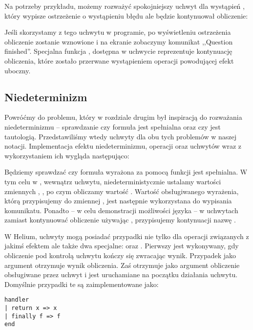 Na potrzeby przykładu, możemy rozważyć spokojniejszy uchwyt dla wystąpień , który wypisze ostrzeżenie o wystąpieniu błędu ale będzie kontynuował obliczenie:



Jeśli skorzystamy z tego uchwytu w programie, po wyświetleniu ostrzeżenia obliczenie  zostanie wznowione i na ekranie zobaczymy komunikat ,,Question finished''. Specjalna funkcja , dostępna w uchwycie reprezentuje kontynuację obliczenia, które zostało przerwane wystąpieniem operacji powodującej efekt uboczny.

\subsection{Niedeterminizm}

Powróćmy do problemu, który w rozdziale drugim był inspiracją do rozważania niedeterminizmu -- sprawdzanie czy formuła jest spełnialna oraz czy jest tautologią. Przedstawiliśmy wtedy uchwyty dla obu tych problemów w naszej notacji. Implementacja efektu niedeterminizmu, operacji  oraz uchwytów wraz z wykorzystaniem ich wygląda następująco:



Będziemy sprawdzać czy formuła wyrażona za pomocą funkcji  jest spełnialna. W tym celu w , wewnątrz uchwytu, niedeterministycznie ustalamy wartości zmiennych , ,  po czym obliczamy wartość . Wartość obsługiwanego wyrażenia, którą przypisujemy do zmiennej , jest następnie wykorzystana do wypisania komunikatu. Ponadto -- w celu demonstracji możliwości języka -- w uchwytach zamiast kontynuować obliczenie używając , przypisujemy kontynuacji nazwę .

W Helium, uchwyty mogą posiadać przypadki nie tylko dla operacji związanych z jakimś efektem ale także dwa specjalne:  oraz . Pierwszy jest wykonywany, gdy obliczenie pod kontrolą uchwytu kończy się zwracając wynik. Przypadek  jako argument otrzymuje wynik obliczenia. Zaś  otrzymuje jako argument obliczenie obsługiwane przez uchwyt i jest uruchamiane na początku działania uchwytu. Domyślnie przypadki te są zaimplementowane jako:

\begin{lstlisting}
handler
| return x => x
| finally f => f
end
\end{lstlisting}

